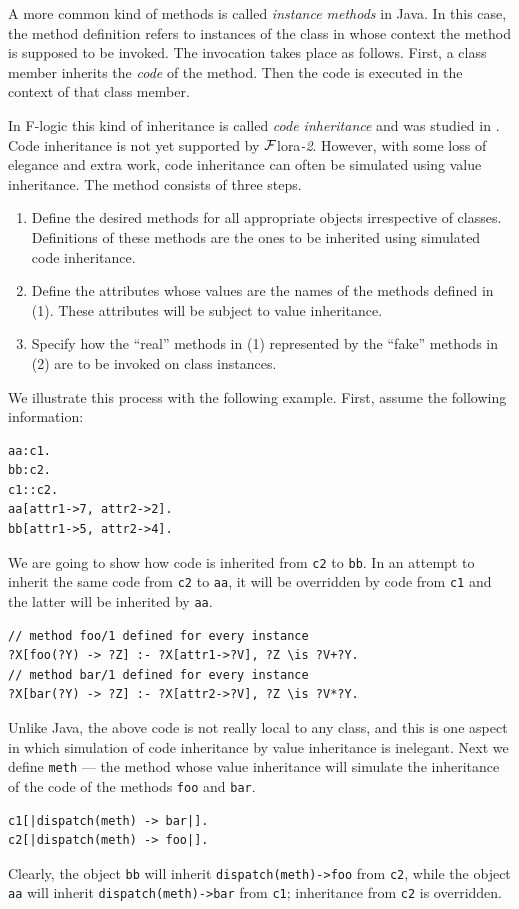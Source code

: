 \documentclass[11pt]{article}
\newcommand{\FLORA}{{\mbox{\sc ${\cal F}${lora}\rm\emph{-2}}}\xspace}
\newcommand{\FLSYSTEM}{\FLORA}
\newcommand{\fl}{\mbox{F-logic}\xspace}
\begin{document}
A more common kind of methods is called \emph{instance methods} in Java.
In this case, the method definition refers to instances of the class in
whose context the method is supposed to be invoked. The invocation takes
place as follows. First, a class member inherits the \emph{code} of the
method. Then the code is executed in the context of that class member.

In \fl this kind of inheritance is called \emph{code inheritance} and was
studied in \cite{code-inheritance-2003,kifer-yang-inheritance-2006}. Code inheritance is not yet
supported by \FLSYSTEM. However, with some loss of
elegance and extra work, code inheritance can often be simulated using value
inheritance. The method consists of three steps.
\begin{enumerate}
\item  Define the desired methods for all appropriate objects irrespective of
  classes. Definitions of these methods are the ones to be inherited using
  simulated code inheritance.
\item Define the attributes whose values are the names of the methods defined
  in (1).  These attributes will be subject to value inheritance.
\item  Specify how the ``real'' methods in (1) represented by
  the ``fake'' methods in (2) are to be invoked on class instances.
\end{enumerate}
We illustrate this process with the following example. First, assume the
following information:
\begin{verbatim}
aa:c1.
bb:c2.
c1::c2.
aa[attr1->7, attr2->2].
bb[attr1->5, attr2->4].  
\end{verbatim}
We are going to show how code is inherited from {\tt c2} to {\tt bb}. In
an attempt to inherit the same code from {\tt c2} to {\tt aa}, it
will be overridden by code from {\tt c1} and the latter will be inherited
by {\tt aa}. 
\begin{verbatim}
// method foo/1 defined for every instance
?X[foo(?Y) -> ?Z] :- ?X[attr1->?V], ?Z \is ?V+?Y.
// method bar/1 defined for every instance
?X[bar(?Y) -> ?Z] :- ?X[attr2->?V], ?Z \is ?V*?Y.  
\end{verbatim}
Unlike Java, the above code is not really local to any class, and this is
one aspect in which simulation of code inheritance by value inheritance is
inelegant. Next we define {\tt meth} --- the method whose
value inheritance will simulate the inheritance of the code of the methods
{\tt foo} and {\tt bar}.   
\begin{verbatim}
c1[|dispatch(meth) -> bar|].  
c2[|dispatch(meth) -> foo|].
\end{verbatim}
Clearly, the object {\tt bb} will inherit {\tt dispatch(meth)->foo} from
{\tt c2},
while the object {\tt aa}    will inherit {\tt dispatch(meth)->bar} from
{\tt c1};
inheritance from {\tt c2} is overridden.  
\end{document}
